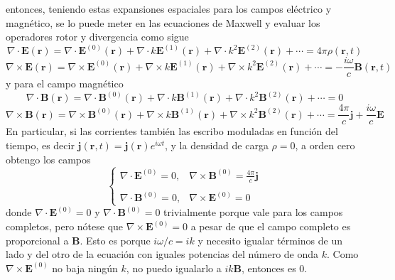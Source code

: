 entonces, teniendo estas expansiones espaciales para los campos eléctrico y magnético, se lo puede meter en las ecuaciones de Maxwell y evaluar los operadores rotor y divergencia como sigue
\begin{equation*}
    \nabla \cdot \textbf{E}(\textbf{r}) = 
    \nabla \cdot \textbf{E}^{(0)}(\textbf{r}) + 
    \nabla \cdot k\textbf{E}^{(1)}(\textbf{r}) + 
    \nabla \cdot k^{2}\textbf{E}^{(2)}(\textbf{r}) + \cdots
    = 4\pi\rho(\textbf{r},t)
\end{equation*}
\begin{equation*}
    \nabla \times \textbf{E}(\textbf{r}) = 
    \nabla \times \textbf{E}^{(0)}(\textbf{r}) + 
    \nabla \times k\textbf{E}^{(1)}(\textbf{r}) + 
    \nabla \times k^{2}\textbf{E}^{(2)}(\textbf{r}) + \cdots
    = -\frac{i\omega}{c}\textbf{B}(\textbf{r},t)
\end{equation*}
y para el campo magnético
\begin{equation*}
    \nabla \cdot \textbf{B}(\textbf{r}) = 
    \nabla \cdot \textbf{B}^{(0)}(\textbf{r}) + 
    \nabla \cdot k\textbf{B}^{(1)}(\textbf{r}) + 
    \nabla \cdot k^{2}\textbf{B}^{(2)}(\textbf{r}) + \cdots
    = 0
\end{equation*}
\begin{equation*}
    \nabla \times \textbf{B}(\textbf{r}) = 
    \nabla \times \textbf{B}^{(0)}(\textbf{r}) + 
    \nabla \times k\textbf{B}^{(1)}(\textbf{r}) + 
    \nabla \times k^{2}\textbf{B}^{(2)}(\textbf{r}) + \cdots
    = \frac{4\pi}{c}\textbf{j} + \frac{i\omega}{c}\textbf{E}
\end{equation*}
En particular, si las corrientes también las escribo moduladas en función del tiempo, es decir $\textbf{j}(\textbf{r},t) = \textbf{j}(\textbf{r})e^{i\omega t}$, y la densidad de carga $\rho = 0$, a orden cero obtengo los campos
\begin{equation*}
    \left\{
        \begin{matrix}
            \nabla \cdot \textbf{E}^{(0)} = 0,
            &
            \nabla \times \textbf{B}^{(0)} = \frac{4\pi}{c}\textbf{j}\\
            & \\
            \nabla \cdot \textbf{B}^{(0)} = 0,
            &
            \nabla \times \textbf{E}^{(0)} = 0
        \end{matrix}
    \right.
\end{equation*}
donde $\nabla \cdot \textbf{E}^{(0)} = 0$ y $\nabla \cdot \textbf{B}^{(0)} = 0 $ trivialmente porque vale para los campos completos, pero nótese que $\nabla \times \textbf{E}^{(0)} = 0$ a pesar de que el campo completo es proporcional a $\textbf{B}$. Esto es porque $i\omega/c = ik$ y necesito igualar términos de un lado y del otro de la ecuación con iguales potencias del número de onda $k$. Como $\nabla \times \textbf{E}^{(0)}$ no baja ningún $k$, no puedo igualarlo a $ik \textbf{B}$, entonces es 0.\\
